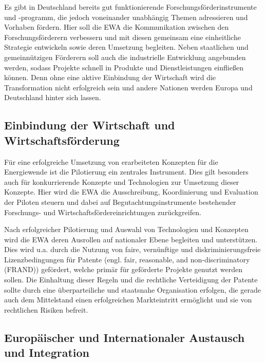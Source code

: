 Es gibt in Deutschland bereits gut funktionierende Forschungsförderinstrumente und -programm, die jedoch voneinander unabhängig Themen adressieren und Vorhaben fördern.
Hier soll die EWA die Kommunikation zwischen den Forschungsförderern verbessern und mit diesen gemeinsam eine einheitliche Strategie entwickeln sowie deren Umsetzung begleiten.
Neben staatlichen und gemeinnützigen Förderern soll auch die industrielle Entwicklung angebunden werden, sodass Projekte schnell in Produkte und Dienstleistungen einfließen können.
Denn ohne eine aktive Einbindung der Wirtschaft wird die Transformation nicht erfolgreich sein und andere Nationen werden Europa und Deutschland hinter sich lassen.

\subsection{Einbindung der Wirtschaft und Wirtschaftsförderung}

Für eine erfolgreiche Umsetzung von erarbeiteten Konzepten für die Energiewende ist die Pilotierung ein zentrales Instrument.
Dies gilt besonders auch für konkurrierende Konzepte und Technologien zur Umsetzung dieser Konzepte.
Hier wird die EWA die Ausschreibung, Koordinierung und Evaluation der Piloten steuern und dabei auf Begutachtungsinstrumente bestehender Forschungs- und Wirtschaftsfördereinrichtungen zurückgreifen.

Nach erfolgreicher Pilotierung und Auswahl von Technologien und Konzepten wird die EWA deren Ausrollen auf nationaler Ebene begleiten und unterstützen.
Dies wird u.a. durch die Nutzung von faire, vernünftige und diskriminierungsfreie Lizenzbedingungen für Patente (engl. fair, reasonable, and non-discriminatory (FRAND)) gefördert, welche primär für geförderte Projekte genutzt werden sollen.
Die Einhaltung dieser Regeln und die rechtliche Verteidigung der Patente sollte durch eine überparteiliche und staatsnahe Organisation erfolgen, die gerade auch dem Mittelstand einen erfolgreichen Markteintritt ermöglicht und sie von rechtlichen Risiken befreit.
 

\subsection{Europäischer und Internationaler Austausch und Integration}

